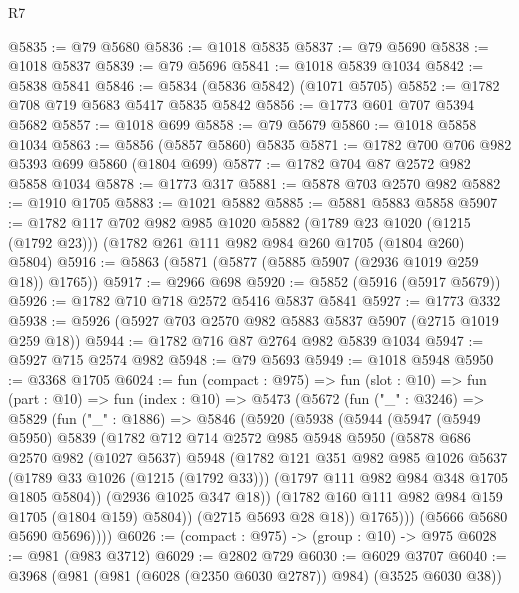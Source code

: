 \begin{lexlean}{R7}
\begin{coremodule}
@5835 := @79 @5680
@5836 := @1018 @5835
@5837 := @79 @5690
@5838 := @1018 @5837
@5839 := @79 @5696
@5841 := @1018 @5839 @1034
@5842 := @5838 @5841
@5846 := @5834 (@5836 @5842) (@1071 @5705)
@5852 := @1782 @708 @719 @5683 @5417 @5835 @5842
@5856 := @1773 @601 @707 @5394 @5682
@5857 := @1018 @699
@5858 := @79 @5679
@5860 := @1018 @5858 @1034
@5863 := @5856 (@5857 @5860) @5835
@5871 := @1782 @700 @706 @982 @5393 @699 @5860 (@1804 @699)
@5877 := @1782 @704 @87 @2572 @982 @5858 @1034
@5878 := @1773 @317
@5881 := @5878 @703 @2570 @982
@5882 := @1910 @1705
@5883 := @1021 @5882
@5885 := @5881 @5883 @5858
@5907 := @1782
    @117
    @702
    @982
    @985
    @1020
    @5882
    (@1789 @23 @1020 (@1215 (@1792 @23)))
    (@1782 @261 @111 @982 @984 @260 @1705 (@1804 @260) @5804)
@5916 := @5863 (@5871 (@5877 (@5885 @5907 (@2936 @1019 @259 @18)) @1765))
@5917 := @2966 @698
@5920 := @5852 (@5916 (@5917 @5679))
@5926 := @1782 @710 @718 @2572 @5416 @5837 @5841
@5927 := @1773 @332
@5938 := @5926 (@5927 @703 @2570 @982 @5883 @5837 @5907 (@2715 @1019 @259 @18))
@5944 := @1782 @716 @87 @2764 @982 @5839 @1034
@5947 := @5927 @715 @2574 @982
@5948 := @79 @5693
@5949 := @1018 @5948
@5950 := @3368 @1705
@6024 := fun (compact : @975) =>
  fun (slot : @10) =>
  fun (part : @10) =>
  fun (index : @10) =>
  @5473
    (@5672
      (fun ("_" : @3246) =>
      @5829
        (fun ("_" : @1886) =>
        @5846
          (@5920
            (@5938
              (@5944
                (@5947
                  (@5949 @5950)
                  @5839
                  (@1782
                    @712
                    @714
                    @2572
                    @985
                    @5948
                    @5950
                    (@5878
                      @686
                      @2570
                      @982
                      (@1027 @5637)
                      @5948
                      (@1782
                        @121
                        @351
                        @982
                        @985
                        @1026
                        @5637
                        (@1789 @33 @1026 (@1215 (@1792 @33)))
                        (@1797 @111 @982 @984 @348 @1705 @1805 @5804))
                      (@2936 @1025 @347 @18))
                    (@1782 @160 @111 @982 @984 @159 @1705 (@1804 @159) @5804))
                  (@2715 @5693 @28 @18))
                @1765)))
          (@5666 @5680 @5690 @5696))))
@6026 := (compact : @975) -> (group : @10) -> @975
@6028 := @981 (@983 @3712)
@6029 := @2802 @729
@6030 := @6029 @3707
@6040 := @3968 (@981 (@981 (@6028 (@2350 @6030 @2787)) @984) (@3525 @6030 @38))

\end{coremodule}
\end{lexlean}

